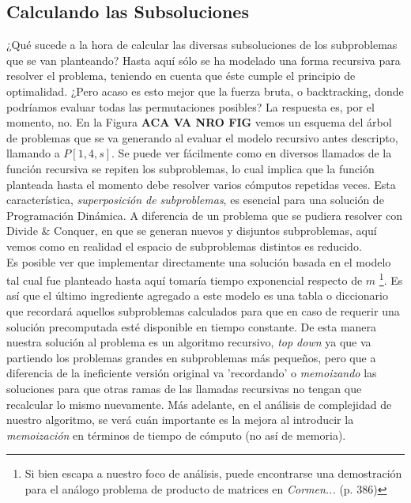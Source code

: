 \subsection{Calculando las Subsoluciones}

¿Qué sucede a la hora de calcular las diversas subsoluciones de los subproblemas que se van planteando? Hasta aquí sólo se ha modelado una forma recursiva para resolver el problema, teniendo en cuenta que éste cumple el principio de optimalidad. ¿Pero acaso es esto mejor que la fuerza bruta, o backtracking, donde podríamos evaluar todas las permutaciones posibles? La respuesta es, por el momento, no. En la Figura \textbf{ACA VA NRO FIG} vemos un esquema del árbol de problemas que se va generando al evaluar el modelo recursivo antes descripto, llamando a $P[1,4,s]$. Se puede ver fácilmente como en diversos llamados de la función recursiva se repiten los subproblemas, lo cual implica que la función planteada hasta el momento debe resolver varios cómputos repetidas veces. Esta característica, \textsl{superposición de subproblemas}, es esencial para una solución de Programación Dinámica. A diferencia de un problema que se pudiera resolver con Divide \& Conquer, en que se generan nuevos y disjuntos subproblemas, aquí vemos como en realidad el espacio de subproblemas distintos es reducido.\\
\indent Es posible ver que implementar directamente una solución basada en el modelo tal cual fue planteado hasta aquí tomaría tiempo exponencial respecto de $m$ \footnote{Si bien escapa a nuestro foco de análisis, puede encontrarse una demostración para el análogo problema de producto de matrices en \textit{Cormen...} (p. 386)}. Es así que el último ingrediente agregado a este modelo es una tabla o diccionario que recordará aquellos subproblemas calculados para que en caso de requerir una solución precomputada esté disponible en tiempo constante. De esta manera nuestra solución al problema es un algoritmo recursivo, \textsl{top down} ya que va partiendo los problemas grandes en subproblemas más pequeños, pero que a diferencia de la ineficiente versión original va 'recordando' o \textsl{memoizando} las soluciones para que otras ramas de las llamadas recursivas no tengan que recalcular lo mismo nuevamente. Más adelante, en el análisis de complejidad de nuestro algoritmo, se verá cuán importante es la mejora al introducir la \textsl{memoización} en términos de tiempo de cómputo (no así de memoria).

